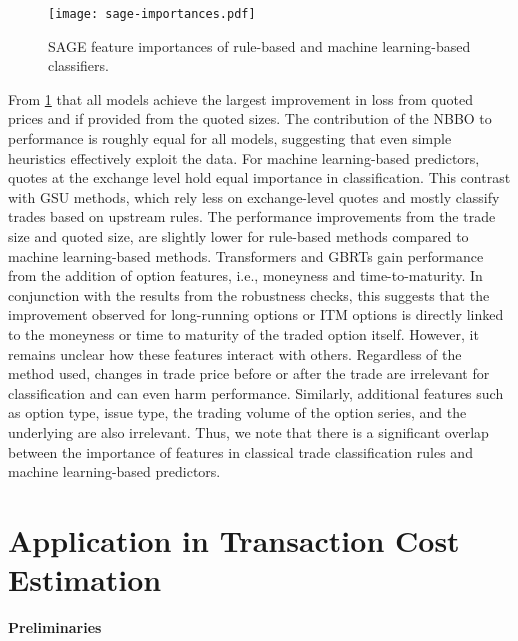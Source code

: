 \begin{figure}[h!]
    \centering
    \texttt{[image: sage-importances.pdf]}
    \caption[ Feature Importances For Classifiers]{\gls{SAGE} feature importances of rule-based and machine learning-based classifiers.}
    \label{fig:sage-importances}
\end{figure}

From \cref{fig:sage-importances} that all models achieve the largest improvement in loss from quoted prices and if provided from the quoted sizes. The contribution of the \gls{NBBO} to performance is roughly equal for all models, suggesting that even simple heuristics effectively exploit the data. For machine learning-based predictors, quotes at the exchange level hold equal importance in classification. This contrast with \gls{GSU} methods, which rely less on exchange-level quotes and mostly classify trades based on upstream rules. The performance improvements from the trade size and quoted size, are slightly lower for rule-based methods compared to machine learning-based methods.  Transformers and \glspl{GBRT} gain performance from the addition of option features, i.e., moneyness and time-to-maturity. In conjunction with the results from the robustness checks, this suggests that the improvement observed for long-running options or \gls{ITM} options is directly linked to the moneyness or time to maturity of the traded option itself. However, it remains unclear how these features interact with others. Regardless of the method used, changes in trade price before or after the trade are irrelevant for classification and can even harm performance. Similarly, additional features such as option type, issue type, the trading volume of the option series, and the underlying are also irrelevant. Thus, we note that there is a significant overlap between the importance of features in classical trade classification rules and machine learning-based predictors.


\clearpage

\section{Application in Transaction Cost Estimation}\label{sec:application}

\textbf{Preliminaries}


